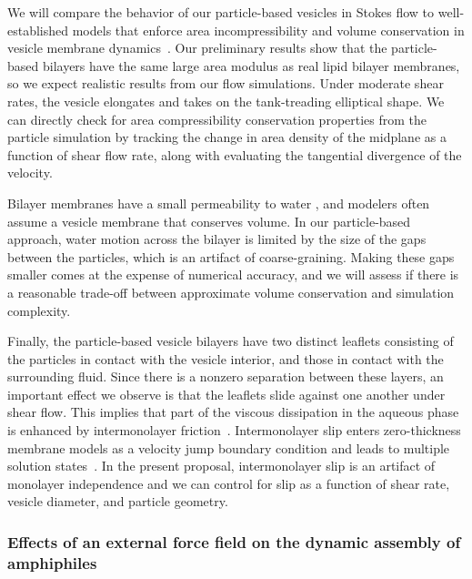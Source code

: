 
We will compare the behavior of our particle-based vesicles in Stokes
flow to well-established models that enforce area incompressibility and
volume conservation in vesicle membrane
dynamics~\cite{torres-sanchez_millan_arroyo_2019,
mahapatra_saintillan_rangamani_2020, Steigmann99, C6SM02452A}. Our
preliminary results show that the particle-based bilayers have the same
large area modulus as real lipid bilayer membranes, so we expect
realistic results from our flow simulations. Under moderate shear rates,
the vesicle elongates and takes on the tank-treading elliptical shape.
We can directly check for area compressibility conservation properties
from the particle simulation by tracking the change in area density of
the midplane as a function of shear flow rate, along with evaluating the
tangential divergence of the velocity.


Bilayer membranes have a small permeability to water
\cite{323e9a2f0c58487ea82518d7a1f96485}, and modelers often assume a
vesicle membrane that conserves volume. In our particle-based approach,
water motion across the bilayer is limited by the size of the gaps
between the particles, which is an artifact of coarse-graining.  Making
these gaps smaller comes at the expense of numerical accuracy, and we
will assess if there is a reasonable trade-off between approximate
volume conservation and simulation complexity. 



Finally, the particle-based vesicle bilayers have two distinct leaflets
consisting of the particles in contact with the vesicle interior, and
those in contact with the surrounding fluid. Since there is a nonzero
separation between these layers, an important effect we observe is that
the leaflets slide against one another under shear flow.  This implies
that part of the viscous dissipation in the aqueous phase is enhanced by
intermonolayer friction~\cite{SHKULIPA2005823, ShkulipaThesis}.
Intermonolayer slip enters zero-thickness membrane models as a velocity
jump boundary condition and leads to multiple solution
states~\cite{schwalbe_vlahovska_miksis_2010}.  In the present proposal,
intermonolayer slip is an artifact of monolayer independence  and we can
control for slip as a function of shear rate, vesicle diameter, and
particle geometry.

\subsubsection{Effects of an external force field on the dynamic assembly of amphiphiles}




